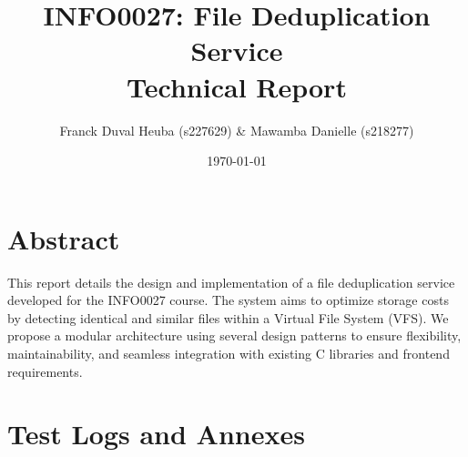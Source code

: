 \documentclass[11pt,a4paper]{article}
\title{INFO0027: File Deduplication Service \\ Technical Report}
\author{Franck Duval Heuba (s227629) \& Mawamba Danielle (s218277)}
\date{\today}
\begin{document}
\maketitle

\section*{Abstract}
This report details the design and implementation of a file deduplication service developed for the INFO0027 course. The system aims to optimize storage costs by detecting identical and similar files within a Virtual File System (VFS). We propose a modular architecture using several design patterns to ensure flexibility, maintainability, and seamless integration with existing C libraries and frontend requirements.








\newpage
\appendix
\section{Test Logs and Annexes}

\end{document}
